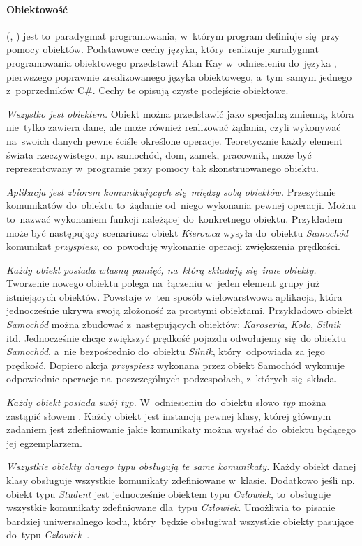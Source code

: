 \paragraph{Obiektowość}
 (, ) jest to~paradygmat programowania, w~którym program definiuje się~przy pomocy obiektów.
Podstawowe cechy języka, który~realizuje paradygmat programowania obiektowego przedstawił Alan Kay w~odniesieniu do~języka , pierwszego poprawnie zrealizowanego języka obiektowego, a~tym samym jednego z~poprzedników C\#. Cechy te opisują czyste podejście obiektowe.
\begin{description}
	\item \emph{Wszystko jest obiektem.} Obiekt można przedstawić jako specjalną zmienną, która nie~tylko zawiera dane, ale może również realizować żądania, czyli wykonywać na~swoich danych pewne ściśle określone operacje. Teoretycznie każdy element świata rzeczywistego, np. samochód, dom, zamek, pracownik, może być reprezentowany w~programie przy pomocy tak skonstruowanego obiektu.
	\item \emph{Aplikacja jest zbiorem komunikujących się~między sobą obiektów.} Przesyłanie komunikatów do~obiektu to~żądanie od~niego wykonania pewnej operacji. Można to~nazwać wykonaniem funkcji należącej do~konkretnego obiektu. Przykładem może być następujący scenariusz: obiekt \emph{Kierowca} wysyła do~obiektu \emph{Samochód} komunikat \emph{przyspiesz}, co~powoduję wykonanie operacji zwiększenia prędkości.
	\item \emph{Każdy obiekt posiada własną pamięć, na~którą składają się~inne obiekty.} Tworzenie nowego obiektu polega na~łączeniu w~jeden element grupy już istniejących obiektów. Powstaje w~ten sposób wielowarstwowa aplikacja, która jednocześnie ukrywa swoją złożoność za prostymi obiektami. Przykładowo obiekt \emph{Samochód} można zbudować z~następujących obiektów: \emph{Karoseria}, \emph{Koło}, \emph{Silnik} itd. Jednocześnie chcąc zwiększyć prędkość pojazdu odwołujemy się~do obiektu \emph{Samochód}, a~nie bezpośrednio do~obiektu \emph{Silnik}, który~odpowiada za jego prędkość. Dopiero akcja \emph{przyspiesz} wykonana przez obiekt Samochód wykonuje odpowiednie operacje na~poszczególnych podzespołach, z~których się~składa.
	\item \emph{Każdy obiekt posiada swój typ.} W~odniesieniu do~obiektu słowo \emph{typ} można zastąpić słowem . Każdy obiekt jest instancją pewnej klasy, której głównym zadaniem jest zdefiniowanie jakie komunikaty można wysłać do~obiektu będącego jej egzemplarzem.
	\item \emph{Wszystkie obiekty danego typu obsługują te same komunikaty.} Każdy obiekt danej klasy obsługuje wszystkie komunikaty zdefiniowane w~klasie. Dodatkowo jeśli np. obiekt typu \emph{Student} jest jednocześnie obiektem typu \emph{Człowiek}, to~obsługuje wszystkie komunikaty zdefiniowane dla~typu \emph{Człowiek}. Umożliwia to~pisanie bardziej uniwersalnego kodu, który~będzie obsługiwał wszystkie obiekty pasujące do~typu \emph{Człowiek}~\cite{cSharp:progr}.
\end{description}

